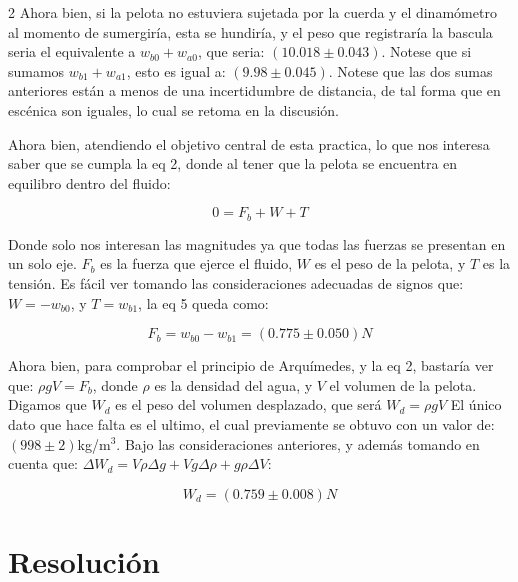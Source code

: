 \documentclass[10pt,letterpaper]{article}
\begin{document}
\begin{multicols}{2}
    Ahora bien, si la pelota no estuviera sujetada por la cuerda y el dinamómetro al momento de sumergiría, esta se hundiría, y el peso que registraría la bascula seria el equivalente a $w_{b0} + w_{a0}$, que seria: $(10.018 \pm 0.043)$. Notese que si sumamos $w_{b1} + w_{a1}$, esto es igual a: $(9.98 \pm 0.045)$. Notese que las dos sumas anteriores están a menos de una incertidumbre de distancia, de tal forma que en escénica son iguales, lo cual se retoma en la discusión.

    Ahora bien, atendiendo el objetivo central de esta practica, lo que nos interesa saber que se cumpla la eq 2, donde al tener que la pelota se encuentra en equilibro dentro del fluido:
    
    \begin{equation}
        0 = F_b + W + T
    \end{equation}

    Donde solo nos interesan las magnitudes ya que todas las fuerzas se presentan en un solo eje. $F_b$ es la fuerza que ejerce el fluido, $W$ es el peso de la pelota, y $T$ es la tensión. Es fácil ver tomando las consideraciones adecuadas de signos que: $W = -w_{b0}$, y $T = w_{b1}$, la eq 5 queda como:

    \begin{equation}
        F_b = w_{b0} - w_{b1} = (0.775 \pm 0.050)N
    \end{equation}

    Ahora bien, para comprobar el principio de Arquímedes, y la eq 2, bastaría ver que: $\rho g V = F_b$, donde $\rho$ es la densidad del agua, y $V$ el volumen de la pelota.
    Digamos que $W_d$ es el peso del volumen desplazado, que será $W_d = \rho g V$
    El único dato que hace falta es el ultimo, el cual previamente se obtuvo con un valor de: $(998 \pm 2)$kg/m$^3$. Bajo las consideraciones anteriores, y además tomando en cuenta que: $\Delta W_d = V \rho \Delta g + Vg \Delta \rho + g \rho \Delta V$:

    \begin{equation}
        W_d = (0.759 \pm 0.008)N
    \end{equation}

    \end{multicols}


    \vspace{0.7cm}    

    \hline

    \section{Resolución}
\end{document}
